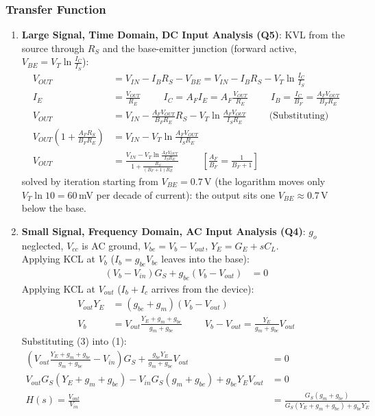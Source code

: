 \subsubsection{Transfer Function}
\begin{enumerate}
  \item \textbf{Large Signal, Time Domain, DC Input Analysis (Q5)}:
    KVL from the source through \(R_S\) and the base-emitter junction (forward
    active, \(V_{BE} = V_T \ln\frac{I_C}{I_S}\)):
    \begin{align*}
      V_{OUT} &= V_{IN} - I_B R_S - V_{BE} = V_{IN} - I_B R_S - V_T \ln\frac{I_C}{I_S} \\
      I_E &= \frac{V_{OUT}}{R_E} \hspace{1cm} I_C = A_F I_E = A_F \frac{V_{OUT}}{R_E} \hspace{1cm} I_B = \frac{I_C}{B_F} = \frac{A_F V_{OUT}}{B_F R_E} \\
      V_{OUT} &= V_{IN} - \frac{A_F V_{OUT}}{B_F R_E} R_S - V_T \ln\frac{A_F V_{OUT}}{I_S R_E} \hspace{1cm} \text{(Substituting)} \\
      V_{OUT}\left(1 + \frac{A_F R_S}{B_F R_E}\right) &= V_{IN} - V_T \ln\frac{A_F V_{OUT}}{I_S R_E} \\
      V_{OUT} &= \frac{V_{IN} - V_T \ln\frac{A_F V_{OUT}}{I_S R_E}}{1 + \frac{R_S}{(B_F + 1) R_E}} \hspace{1cm} [\tfrac{A_F}{B_F} = \tfrac{1}{B_F + 1}]
    \end{align*}
    solved by iteration starting from \(V_{BE} = 0.7\,\)V (the logarithm moves
    only \(V_T \ln 10 = 60\,\)mV per decade of current): the output sits one
    \(V_{BE} \approx 0.7\,\)V below the base.
  \item \textbf{Small Signal, Frequency Domain, AC Input Analysis (Q4)}:
    \(g_o\) neglected, \(V_{cc}\) is AC ground, \(V_{be} = V_b - V_{out}\), \(Y_E = G_E + sC_L\).\\
    Applying KCL at \(V_b\) (\(I_b = g_{be} V_{be}\) leaves into the base):
    \begin{align*}
      (V_b - V_{in}) G_S + g_{be}(V_b - V_{out}) &= 0 \tag{1}
    \end{align*}
    Applying KCL at \(V_{out}\) (\(I_b + I_c\) arrives from the device):
    \begin{align*}
      V_{out} Y_E &= (g_{be} + g_m)(V_b - V_{out}) \tag{2} \\
      V_b &= V_{out}\frac{Y_E + g_m + g_{be}}{g_m + g_{be}} \hspace{1cm}
      V_b - V_{out} = \frac{Y_E}{g_m + g_{be}} V_{out} \tag{3}
    \end{align*}
    Substituting (3) into (1):
    \begin{align*}
      \left(V_{out}\frac{Y_E + g_m + g_{be}}{g_m + g_{be}} - V_{in}\right) G_S + \frac{g_{be} Y_E}{g_m + g_{be}} V_{out} &= 0 \\
      V_{out} G_S (Y_E + g_m + g_{be}) - V_{in} G_S (g_m + g_{be}) + g_{be} Y_E V_{out} &= 0 \\
      H(s) = \frac{V_{out}}{V_{in}} &= \frac{G_S (g_m + g_{be})}{G_S (Y_E + g_m + g_{be}) + g_{be} Y_E} \tag{4}
    \end{align*}
\end{enumerate}

